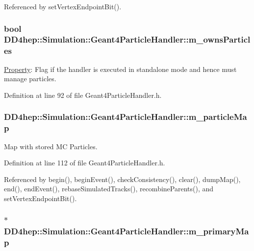 Referenced by setVertexEndpointBit().\hypertarget{class_d_d4hep_1_1_simulation_1_1_geant4_particle_handler_a81a2c3bad5037dd9fcffdf233f7c69e2}{
\subsubsection[{m\_\-ownsParticles}]{\setlength{\rightskip}{0pt plus 5cm}bool {\bf DD4hep::Simulation::Geant4ParticleHandler::m\_\-ownsParticles}}}
\label{class_d_d4hep_1_1_simulation_1_1_geant4_particle_handler_a81a2c3bad5037dd9fcffdf233f7c69e2}


\hyperlink{class_d_d4hep_1_1_property}{Property}: Flag if the handler is executed in standalone mode and hence must manage particles. 

Definition at line 92 of file Geant4ParticleHandler.h.\hypertarget{class_d_d4hep_1_1_simulation_1_1_geant4_particle_handler_a9f1973d25638be1fbfad9166a681d765}{
\subsubsection[{m\_\-particleMap}]{ {\bf DD4hep::Simulation::Geant4ParticleHandler::m\_\-particleMap}}}
\label{class_d_d4hep_1_1_simulation_1_1_geant4_particle_handler_a9f1973d25638be1fbfad9166a681d765}


Map with stored MC Particles. 

Definition at line 112 of file Geant4ParticleHandler.h.

Referenced by begin(), beginEvent(), checkConsistency(), clear(), dumpMap(), end(), endEvent(), rebaseSimulatedTracks(), recombineParents(), and setVertexEndpointBit().\hypertarget{class_d_d4hep_1_1_simulation_1_1_geant4_particle_handler_a7b305cc199ec643d3014483dcc8a93b2}{
\subsubsection[{m\_\-primaryMap}]{$\ast$ {\bf DD4hep::Simulation::Geant4ParticleHandler::m\_\-primaryMap}}}
\label{class_d_d4hep_1_1_simulation_1_1_geant4_particle_handler_a7b305cc199ec643d3014483dcc8a93b2}


